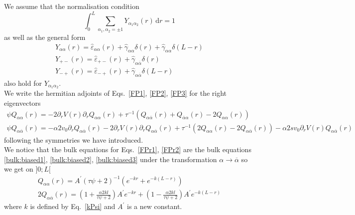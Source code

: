 \documentclass[pre,aps,superscriptaddress,nofootinbib]{revtex4}
\begin{document}
We assume that the normalisation condition
\begin{equation}
\int_0^L \sum_{\alpha_1, \alpha_2 = \pm 1} Y_{\alpha_1\alpha_2}(r) \, \mathrm{d}r = 1
\label{normalisation_pave}
\end{equation}
as well as the general form
\begin{eqnarray}
Y_{\alpha\alpha}(r) = \hat{\varepsilon}_{\alpha\alpha}(r) + \hat{\gamma}_{\alpha\alpha} \delta (r) +  \hat{\gamma}_{\alpha\alpha} \delta (L - r)\\
Y_{+-}(r) = \hat{\varepsilon}_{+-}(r) + \hat{\gamma}_{\alpha\overline{\alpha}} \delta (r)\\
Y_{-+}(r) = \hat{\varepsilon}_{-+}(r) + \hat{\gamma}_{\alpha\overline{\alpha}} \delta (L - r)
\end{eqnarray}
also hold for $Y_{\alpha_1\alpha_2}$.\\

We write the hermitian adjoints of Eqs.~\ref{FP1}, \ref{FP2}, \ref{FP3} for the right eigenvectors
\begin{eqnarray}
\label{FPr1}
\psi Q_{\alpha\alpha}(r) = -2 \partial_r V(r) \partial_r Q_{\alpha\alpha}(r) + \tau^{-1} (Q_{\alpha\overline{\alpha}}(r) + Q_{\overline{\alpha}\alpha}(r) - 2 Q_{\alpha\alpha}(r))\\
\label{FPr2}
\psi Q_{\alpha\overline{\alpha}}(r) = - \alpha 2 v_0 \partial_r Q_{\alpha\overline{\alpha}}(r) - 2 \partial_r V(r) \partial_r Q_{\alpha\overline{\alpha}}(r) + \tau^{-1} (2 Q_{\alpha\alpha}(r) - 2 Q_{\alpha\overline{\alpha}}(r)) - \alpha 2 s v_0 \partial_r V(r) Q_{\alpha\overline{\alpha}}(r)
\end{eqnarray}
following the symmetries we have introduced.\\

We notice that the bulk equations for Eqs.~\ref{FPr1}, \ref{FPr2} are the bulk equations \eqref{bulk:biased1}, \eqref{bulk:biased2}, \eqref{bulk:biased3} under the transformation $\alpha \to \overline{\alpha}$ so we get on $]0;L[$
\begin{eqnarray}
\label{qaa}
Q_{\alpha\alpha}(r) = A^{\prime} (\tau \psi + 2)^{-1} (e^{-k r} + e^{-k (L - r)})\\
\label{qaoa}
2 Q_{\alpha\overline{\alpha}}(r) = \left(1 + \frac{\alpha 2 k l}{\tau \psi + 2}\right) A^{\prime} e^{- k r} + \left(1 - \frac{\alpha 2 k l}{\tau \psi + 2}\right) A^{\prime} e^{- k (L - r)}
\end{eqnarray}
where $k$ is defined by Eq.~\ref{kPsi} and $A^{\prime}$ is a new constant.\\
\end{document}
